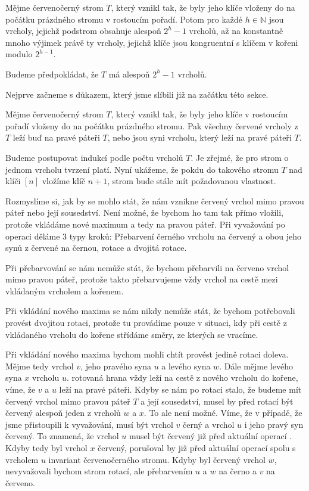 \begin{tvrz}
Mějme červenočerný strom $T$, který vznikl tak, že byly jeho klíče vloženy do na počátku prázdného stromu v rostoucím pořadí. Potom pro každé $h\in \mathbb N$ jsou vrcholy, jejichž podstrom obsahuje alespoň $2^h -1$ vrcholů, až na konstantně mnoho výjimek právě ty vrcholy, jejichž klíče jsou kongruentní s klíčem v kořeni modulo $2^{h-1}$.
\end{tvrz}

\begin{dukaz}
Budeme předpokládat, že $T$ má alespoň $2^h-1$ vrcholů.

Nejprve začneme s důkazem, který jsme slíbili již na začátku této sekce.

\begin{lemma}
Mějme červenočerný strom $T$, který vznikl tak, že byly jeho klíče v rostoucím pořadí vloženy do na počátku prázdného stromu. Pak všechny červené vrcholy z $T$ leží buď na pravé páteři $T$, nebo jsou syni vrcholu, který leží na pravé páteři $T$.
\end{lemma}
\begin{dukaz}
Budeme postupovat indukcí podle počtu vrcholů $T$. Je zřejmé, že pro strom o jednom vrcholu tvrzení platí. Nyní ukážeme, že pokdu do takového stromu $T$ nad klíči $[n]$ vložíme klíč $n+1$, strom bude stále mít požadovanou vlastnost.

Rozmyslíme si, jak by se mohlo stát, že nám vznikne červený vrchol mimo pravou páteř nebo její sousedství. Není možné, že bychom ho tam tak přímo vložili, protože vkládáme nové maximum a tedy na pravou páteř. Při vyvažování po operaci  děláme 3 typy kroků: Přebarvení černého vrcholu na červený a obou jeho synů z červené na černou, rotace a dvojitá rotace.

Při přebarvování se nám nemůže stát, že bychom přebarvili na červeno vrchol mimo pravou páteř, protože takto přebarvujeme vždy vrchol na cestě mezi vkládaným vrcholem a kořenem.

Při vkládání nového maxima se nám nikdy nemůže stát, že bychom potřebovali provést dvojitou rotaci, protože tu provádíme pouze v situaci, kdy při cestě z vkládaného vrcholu do kořene střídáme směry, ze kterých se vracíme.

Při vkládání nového maxima bychom mohli chtít provést jedině rotaci doleva.
Mějme tedy vrchol $v$, jeho pravého syna $u$ a levého syna $w$. Dále mějme levého syna $x$ vrcholu $u$.
rotovaná hrana vždy leží na cestě z nového vrcholu do kořene, víme, že $v$ a
$u$ leží na pravé páteři. Kdyby se nám po rotaci stalo, že budeme mít červený vrchol mimo pravou páteř $T$ a její sousedství, musel by před rotací být červený alespoň jeden z vrcholů $w$ a $x$. To ale není možné. Víme, že v případě, že jsme přistoupili k vyvažování, musí být vrchol $v$ černý a vrchol $u$ i jeho pravý syn červený. To znamená, že vrchol $u$ musel být červený již před aktuální operací . Kdyby tedy byl vrchol $x$ červený, porušoval by již před aktuální operací  spolu s vrcholem $u$ invariant červenočerného stromu. Kdyby byl červený vrchol $w$, nevyvažovali bychom strom rotací, ale přebarvením $u$ a $w$ na černo a $v$ na červeno. 
\end{dukaz}


\end{dukaz}
